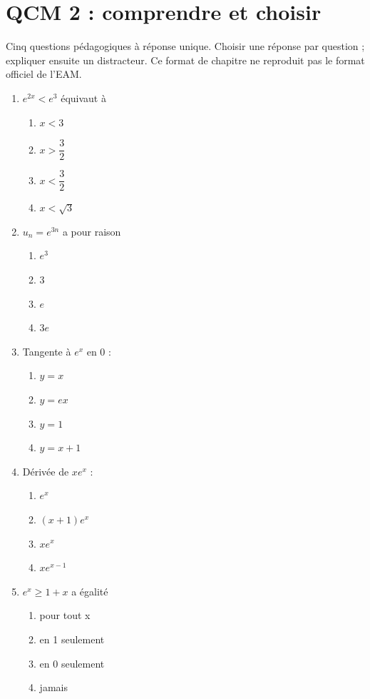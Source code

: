 \endgroup
\begingroup\small
{}\section*{QCM 2 : comprendre et choisir}\label{C09-Q2}
Cinq questions pédagogiques à réponse unique. Choisir une réponse par question ; expliquer ensuite un distracteur. Ce format de chapitre ne reproduit pas le format officiel de l’EAM.
\begin{enumerate}
\item $e^{2x}<e^3$ équivaut à
\begin{enumerate}[label=\Alph*.,itemsep=2pt]
\item $x<3$
\item $x>\dfrac{3}{2}$
\item $x<\dfrac{3}{2}$
\item $x<\sqrt3$
\end{enumerate}
\item $u_n=e^{3n}$ a pour raison
\begin{enumerate}[label=\Alph*.,itemsep=2pt]
\item $e^3$
\item $3$
\item $e$
\item $3e$
\end{enumerate}
\item Tangente à $e^x$ en 0 :
\begin{enumerate}[label=\Alph*.,itemsep=2pt]
\item $y=x$
\item $y=e x$
\item $y=1$
\item $y=x+1$
\end{enumerate}
\item Dérivée de $xe^x$ :
\begin{enumerate}[label=\Alph*.,itemsep=2pt]
\item $e^x$
\item $(x+1)e^x$
\item $xe^x$
\item $xe^{x-1}$
\end{enumerate}
\item $e^x\geq1+x$ a égalité
\begin{enumerate}[label=\Alph*.,itemsep=2pt]
\item pour tout x
\item en 1 seulement
\item en 0 seulement
\item jamais
\end{enumerate}
\end{enumerate}
